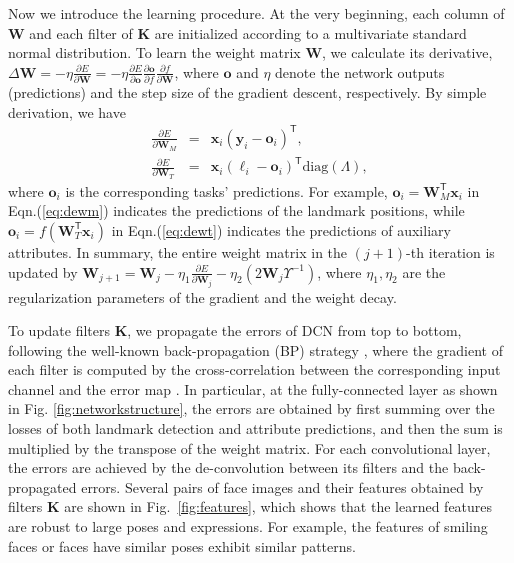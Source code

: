 \documentclass[10pt,journal,compsoc]{IEEEtran}
\newcommand{\x} {\textbf{x}}
\newcommand{\y} {\textbf{y}}
\newcommand{\W} {\textbf{W}}
\newcommand{\K} {\textbf{K}}
\newcommand{\trans}[1]{{#1}^{\ensuremath{\mathsf{T}}}}
\begin{document}
Now we introduce the learning procedure. At the very beginning, each column of $\W$ and each filter of $\K$ are initialized according to a multivariate standard normal distribution. To learn the weight matrix $\W$, we calculate its derivative, $\Delta\W=-\eta\frac{\partial E}{\partial\W}=-\eta\frac{\partial E}{\partial \mathbf{o}}\frac{\partial \mathbf{o}}{\partial f}\frac{\partial f}{\partial\W}$, where $\mathbf{o}$ and $\eta$ denote the network outputs (predictions) and the step size of the gradient descent, respectively. By simple derivation, we have
\begin{eqnarray}
\frac{\partial E}{\partial\W_M}&=&\x_i\trans{(\y_i-\mathbf{o}_i)},\label{eq:dewm}\\
\frac{\partial E}{\partial\W_T}&=&\x_i\trans{(\bm{\ell}_i-\mathbf{o}_i)}\mathrm{diag}(\Lambda),\label{eq:dewt}
\end{eqnarray}
where $\mathbf{o}_i$ is the corresponding tasks' predictions. For example, $\mathbf{o}_i=\trans{\W}_M\x_i$ in Eqn.(\ref{eq:dewm}) indicates the predictions of the landmark positions, while $\mathbf{o}_i=f(\trans{\W}_T\x_i)$ in Eqn.(\ref{eq:dewt}) indicates the predictions of auxiliary attributes. In summary, the entire weight matrix in the $(j+1)$-th iteration is updated by $\W_{j+1}=\W_j-\eta_1\frac{\partial E}{\partial\W_j}-\eta_2(2\W_j\Upsilon^{-1})$, where $\eta_1,\eta_2$ are the regularization parameters of the gradient and the weight decay.

To update filters $\K$, we propagate the errors of DCN from top to bottom, following the well-known back-propagation (BP) strategy \cite{Rumelhart:1988}, where the gradient of each filter is computed by the cross-correlation between the corresponding input channel and the error map \cite{lecun1998gradient}. In particular, at the fully-connected layer as shown in Fig. \ref{fig:networkstructure}, the errors are obtained by first summing over the losses of both landmark detection and attribute predictions, and then the sum is multiplied by the transpose of the weight matrix. For each convolutional layer, the errors are achieved by the de-convolution \cite{lecun1998gradient} between its filters and the back-propagated errors. Several pairs of face images and their features obtained by filters $\K$ are shown in Fig.~\ref{fig:features}, which shows that the learned features are robust to large poses and expressions. For example, the features of smiling faces or faces have similar poses exhibit similar patterns.
\end{document}
